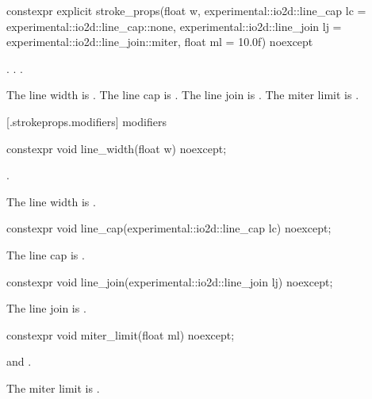 %
\begin{itemdecl}
constexpr explicit stroke_props(float w,
  experimental::io2d::line_cap lc = experimental::io2d::line_cap::none,
  experimental::io2d::line_join lj = experimental::io2d::line_join::miter,
  float ml = 10.0f) noexcept
\end{itemdecl}
\begin{itemdescr}
\pnum
\requires
{}. . .

\pnum
\effects
The line width is . The line cap is . The line join is . The miter limit is .
\end{itemdescr}

 [\iotwod.strokeprops.modifiers] { modifiers}

%
\begin{itemdecl}
constexpr void line_width(float w) noexcept;
\end{itemdecl}
\begin{itemdescr}
\pnum
\requires
{}.

\pnum
\effects
The line width is .
\end{itemdescr}

%
\begin{itemdecl}
constexpr void line_cap(experimental::io2d::line_cap lc) noexcept;
\end{itemdecl}
\begin{itemdescr}
\pnum
\effects
The line cap is .
\end{itemdescr}

%
\begin{itemdecl}
constexpr void line_join(experimental::io2d::line_join lj) noexcept;
\end{itemdecl}
\begin{itemdescr}
\pnum
\effects
The line join is .
\end{itemdescr}

%
\begin{itemdecl}
constexpr void miter_limit(float ml) noexcept;
\end{itemdecl}
\begin{itemdescr}
\pnum
\requires
{} and .

\pnum
\effects
The miter limit is .
\end{itemdescr}

